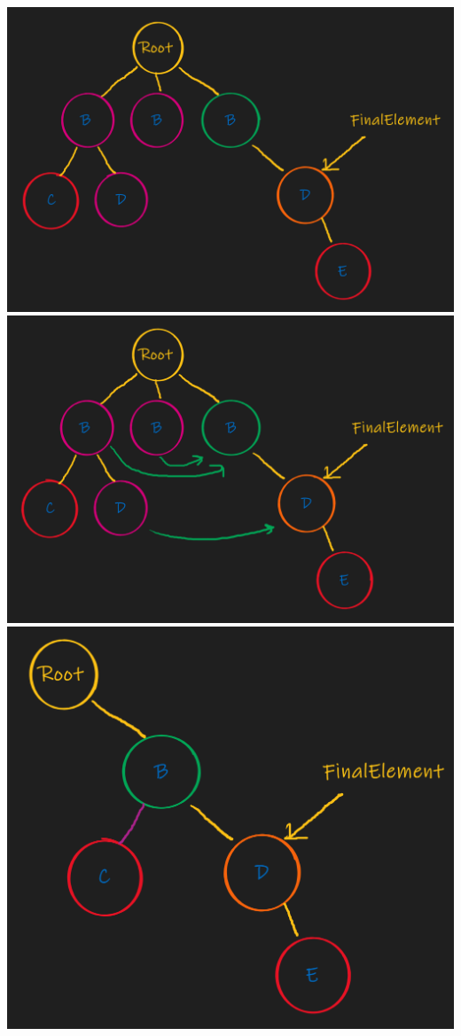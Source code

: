 \documentclass{article}
\begin{document}
\begin{center}
\includegraphics[scale = 0.4]{Figures/TreePrimitives4a.png}
\includegraphics[scale = 0.4]{Figures/TreePrimitives5a.png}
\includegraphics[scale = 0.4]{Figures/TreePrimitives6a.png}
\end{center}
\end{document}
